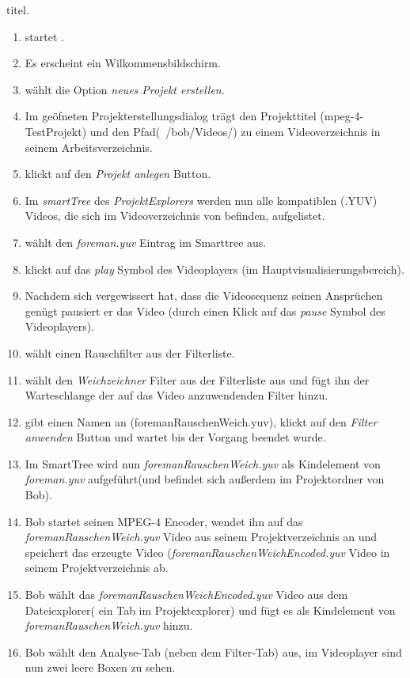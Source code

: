  titel.
\begin{enumerate}
\item \dau startet \projektTitel.
\item Es erscheint ein Wilkommensbildschirm.
\item \dAU wählt die Option \emph{neues Projekt erstellen}.
\item Im geöfneten Projekterstellungsdialog trägt \dAU den Projekttitel (mpeg-4-TestProjekt) und den Pfad(~/bob/Videos/) zu einem Videoverzeichnis in seinem Arbeitsverzeichnis.
\item \dAU klickt auf den \emph{Projekt anlegen} Button.
\item Im \emph{smartTree} des \emph{ProjektExplorers} werden nun alle kompatiblen (.YUV) Videos, die sich
im Videoverzeichnis von \dAU befinden, aufgelistet.
\item \dAU wählt den \emph{foreman.yuv} Eintrag im Smarttree aus.
\item \dAU klickt auf das \emph{play} Symbol des Videoplayers (im Hauptvisualisierungsbereich).
\item Nachdem \dAU sich vergewissert hat, dass die Videosequenz seinen Ansprüchen genügt pausiert er
das Video (durch einen Klick auf das \emph{pause} Symbol des Videoplayers).
\item \dAU wählt einen Rauschfilter aus der Filterliste.
\item \dAU wählt den \emph{Weichzeichner} Filter aus der Filterliste aus und fügt ihn der Warteschlange der auf das Video anzuwendenden Filter hinzu.
\item \dAU gibt einen Namen an (foremanRauschenWeich.yuv), klickt auf den \emph{Filter anwenden} Button und wartet bis der Vorgang beendet wurde.
\item Im SmartTree wird nun \emph{foremanRauschenWeich.yuv} als Kindelement von \emph{foreman.yuv} aufgeführt(und befindet sich außerdem im Projektordner von Bob).
\item Bob startet seinen MPEG-4 Encoder, wendet ihn auf das \emph{foremanRauschenWeich.yuv} Video aus seinem Projektverzeichnis an und speichert das erzeugte Video (\emph{foremanRauschenWeichEncoded.yuv} Video in seinem Projektverzeichnis ab.
\item Bob wählt das \emph{foremanRauschenWeichEncoded.yuv} Video aus dem Dateiexplorer( ein Tab im Projektexplorer) und fügt es als Kindelement von \emph{foremanRauschenWeich.yuv} hinzu.
\item Bob wählt den Analyse-Tab (neben dem Filter-Tab) aus, im Videoplayer sind nun zwei leere Boxen zu sehen.

\end{enumerate}
